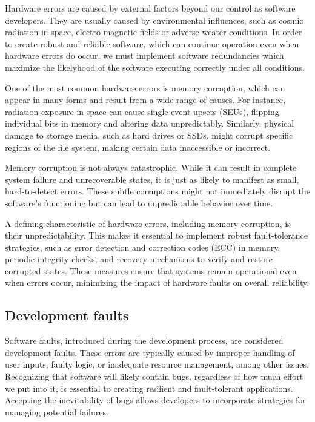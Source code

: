 \documentclass[12pt, letterpaper]{article}
\begin{document}
Hardware errors are caused by external factors beyond our control as software developers. They are usually caused by environmental influences, such as cosmic radiation in space, electro-magnetic fields or adverse weater conditions. In order to create robust and reliable software, which can continue operation even when hardware errors do occur, we must implement software redundancies which maximize the likelyhood of the software executing correctly under all conditions.

One of the most common hardware errors is memory corruption, which can appear in many forms and result from a wide range of causes. For instance, radiation exposure in space can cause single-event upsets (SEUs), flipping individual bits in memory and altering data unpredictably. Similarly, physical damage to storage media, such as hard drives or SSDs, might corrupt specific regions of the file system, making certain data inaccessible or incorrect.

Memory corruption is not always catastrophic. While it can result in complete system failure and unrecoverable states, it is just as likely to manifest as small, hard-to-detect errors. These subtle corruptions might not immediately disrupt the software's functioning but can lead to unpredictable behavior over time.

A defining characteristic of hardware errors, including memory corruption, is their unpredictability. This makes it essential to implement robust fault-tolerance strategies, such as error detection and correction codes (ECC) in memory, periodic integrity checks, and recovery mechanisms to verify and restore corrupted states. These measures ensure that systems remain operational even when errors occur, minimizing the impact of hardware faults on overall reliability.

\subsection{Development faults}

Software faults, introduced during the development process, are considered development faults. These errors are typically caused by improper handling of user inputs, faulty logic, or inadequate resource management, among other issues. Recognizing that software will likely contain bugs, regardless of how much effort we put into it, is essential to creating resilient and fault-tolerant applications. Accepting the inevitability of bugs allows developers to incorporate strategies for managing potential failures.
\end{document}

